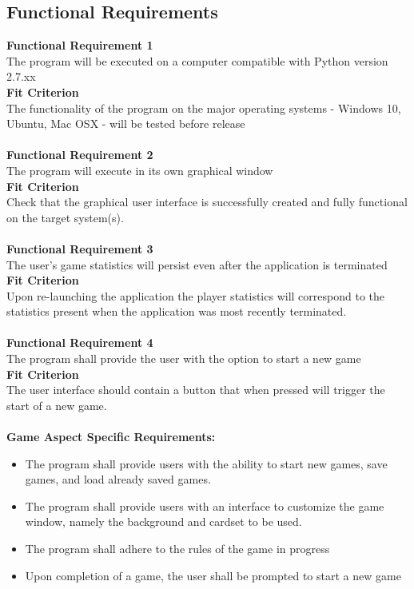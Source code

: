\documentclass[12pt, titlepage]{article}
\newcommand {\PYVER}{2.7.xx }
\begin{document}
		\subsection{Functional Requirements}
		\indent \indent \textbf {Functional Requirement 1} \label{freq1}\\
		\indent \indent The program will be executed on a computer compatible with
		Python version \PYVER\\
		\indent \textbf {Fit Criterion}\\
		\indent \indent The functionality of the program on the major operating
		systems - Windows 10, Ubuntu, Mac OSX - will be tested before release\\\\
		\indent \textbf {Functional Requirement 2} \label{freq2}\\
		\indent \indent The program will execute in its own graphical window\\
		\indent \textbf {Fit Criterion}\\
		\indent \indent Check that the graphical user interface is successfully
		created and fully functional on the target system(s).\\\\
		\indent \textbf {Functional Requirement 3} \label{freq3}\\
		\indent \indent The user’s game statistics will persist even after the 
		application is	terminated\\
		\indent \textbf {Fit Criterion}\\
		\indent \indent Upon re-launching the application the player statistics will
		correspond to the statistics present when the application was most recently
		terminated.\\\\
		\indent \textbf {Functional Requirement 4} \label{freq4}\\
		\indent \indent The program shall provide the user with the option to start a 
		new game\\
		\indent \textbf {Fit Criterion}\\
		\indent \indent The user interface should contain a button that when pressed 
		will trigger the start of a new game.\\\\
		\indent \textbf{Game Aspect Specific Requirements:} \label{GASR}
		\vspace{-2mm}
		\begin{itemize}
			\itemsep0em
			\item The program shall provide users with the ability to start new 
			games, save games, and load already saved games.
			\item The program shall provide users with an interface to 
			customize the game window, namely the background and cardset to be 
			used.
			\item The program shall adhere to the rules of the game in progress
			\item Upon completion of a game, the user shall be prompted to 
			start a new game
		\end{itemize}
\end{document}
